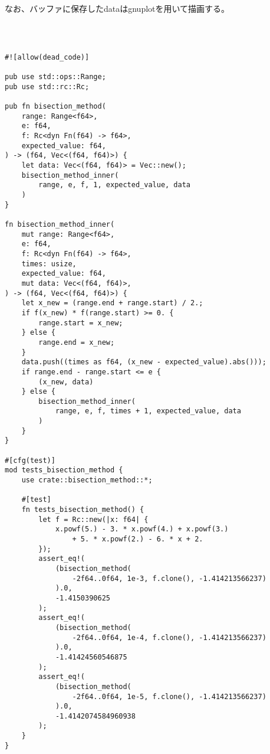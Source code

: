 \documentclass[uplatex, 11pt,a4j, titlepage]{jsarticle}
\begin{document}
なお、バッファに保存したdataはgnuplotを用いて描画する。

\ 

\begin{lstlisting}[caption={bisection\_method.rs}]

#![allow(dead_code)]

pub use std::ops::Range;
pub use std::rc::Rc;
    
pub fn bisection_method(
    range: Range<f64>,
    e: f64,
    f: Rc<dyn Fn(f64) -> f64>,
    expected_value: f64,
) -> (f64, Vec<(f64, f64)>) {
    let data: Vec<(f64, f64)> = Vec::new();
    bisection_method_inner(
        range, e, f, 1, expected_value, data
    )
}
    
fn bisection_method_inner(
    mut range: Range<f64>,
    e: f64,
    f: Rc<dyn Fn(f64) -> f64>,
    times: usize,
    expected_value: f64,
    mut data: Vec<(f64, f64)>,
) -> (f64, Vec<(f64, f64)>) {
    let x_new = (range.end + range.start) / 2.;
    if f(x_new) * f(range.start) >= 0. {
        range.start = x_new;
    } else {
        range.end = x_new;
    }
    data.push((times as f64, (x_new - expected_value).abs()));
    if range.end - range.start <= e {
        (x_new, data)
    } else {
        bisection_method_inner(
            range, e, f, times + 1, expected_value, data
        )
    }
}
    
#[cfg(test)]
mod tests_bisection_method {
    use crate::bisection_method::*;
    
    #[test]
    fn tests_bisection_method() {
        let f = Rc::new(|x: f64| {
            x.powf(5.) - 3. * x.powf(4.) + x.powf(3.) 
                + 5. * x.powf(2.) - 6. * x + 2.
        });
        assert_eq!(
            (bisection_method(
                -2f64..0f64, 1e-3, f.clone(), -1.414213566237)
            ).0,
            -1.4150390625
        );
        assert_eq!(
            (bisection_method(
                -2f64..0f64, 1e-4, f.clone(), -1.414213566237)
            ).0,
            -1.41424560546875
        );
        assert_eq!(
            (bisection_method(
                -2f64..0f64, 1e-5, f.clone(), -1.414213566237)
            ).0,
            -1.4142074584960938
        );
    }
}

\end{lstlisting}
\end{document}
